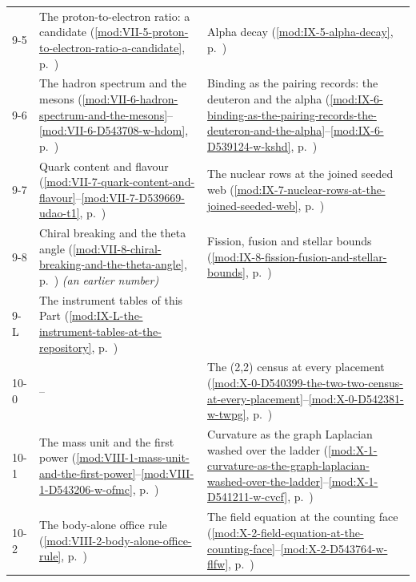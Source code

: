 {\begin{longtable}{p{11mm}p{70mm}p{60mm}}
9-5 & The proton-to-electron ratio: a candidate (\ref{mod:VII-5-proton-to-electron-ratio-a-candidate}, p.~\pageref{mod:VII-5-proton-to-electron-ratio-a-candidate}) & Alpha decay (\ref{mod:IX-5-alpha-decay}, p.~\pageref{mod:IX-5-alpha-decay}) \\
9-6 & The hadron spectrum and the mesons (\ref{mod:VII-6-hadron-spectrum-and-the-mesons}--\ref{mod:VII-6-D543708-w-hdom}, p.~\pageref{mod:VII-6-hadron-spectrum-and-the-mesons}) & Binding as the pairing records: the deuteron and the alpha (\ref{mod:IX-6-binding-as-the-pairing-records-the-deuteron-and-the-alpha}--\ref{mod:IX-6-D539124-w-kshd}, p.~\pageref{mod:IX-6-binding-as-the-pairing-records-the-deuteron-and-the-alpha}) \\
9-7 & Quark content and flavour (\ref{mod:VII-7-quark-content-and-flavour}--\ref{mod:VII-7-D539669-udao-t1}, p.~\pageref{mod:VII-7-quark-content-and-flavour}) & The nuclear rows at the joined seeded web (\ref{mod:IX-7-nuclear-rows-at-the-joined-seeded-web}, p.~\pageref{mod:IX-7-nuclear-rows-at-the-joined-seeded-web}) \\
9-8 & Chiral breaking and the theta angle (\ref{mod:VII-8-chiral-breaking-and-the-theta-angle}, p.~\pageref{mod:VII-8-chiral-breaking-and-the-theta-angle}) \emph{(an earlier number)} & Fission, fusion and stellar bounds (\ref{mod:IX-8-fission-fusion-and-stellar-bounds}, p.~\pageref{mod:IX-8-fission-fusion-and-stellar-bounds}) \\
9-L & The instrument tables of this Part (\ref{mod:IX-L-the-instrument-tables-at-the-repository}, p.~\pageref{mod:IX-L-the-instrument-tables-at-the-repository}) &  \\
10-0 & -- & The (2,2) census at every placement (\ref{mod:X-0-D540399-the-two-two-census-at-every-placement}--\ref{mod:X-0-D542381-w-twpg}, p.~\pageref{mod:X-0-D540399-the-two-two-census-at-every-placement}) \\
10-1 & The mass unit and the first power (\ref{mod:VIII-1-mass-unit-and-the-first-power}--\ref{mod:VIII-1-D543206-w-ofmc}, p.~\pageref{mod:VIII-1-mass-unit-and-the-first-power}) & Curvature as the graph Laplacian washed over the ladder (\ref{mod:X-1-curvature-as-the-graph-laplacian-washed-over-the-ladder}--\ref{mod:X-1-D541211-w-cvcf}, p.~\pageref{mod:X-1-curvature-as-the-graph-laplacian-washed-over-the-ladder}) \\
10-2 & The body-alone office rule (\ref{mod:VIII-2-body-alone-office-rule}, p.~\pageref{mod:VIII-2-body-alone-office-rule}) & The field equation at the counting face (\ref{mod:X-2-field-equation-at-the-counting-face}--\ref{mod:X-2-D543764-w-flfw}, p.~\pageref{mod:X-2-field-equation-at-the-counting-face}) \\

\end{longtable}}
